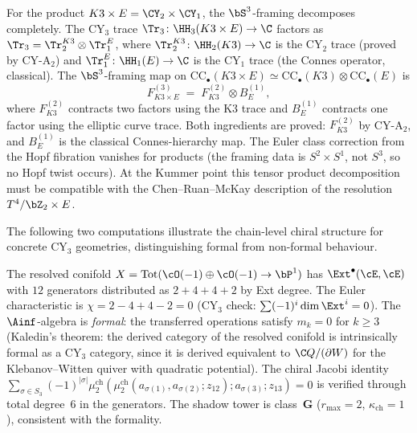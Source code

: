 \begin{remark}
\label{rem:k3e-product-decomposition}
For the product $K3 \times E = \CY_2 \times \CY_1$, the $\bS^3$-framing decomposes completely. The CY$_3$ trace $\Tr_3 \colon \HH_3(K3 \times E) \to \C$ factors as $\Tr_3 = \Tr_2^{K3} \otimes \Tr_1^E$, where $\Tr_2^{K3} \colon \HH_2(K3) \to \C$ is the CY$_2$ trace (proved by CY-A$_2$) and $\Tr_1^E \colon \HH_1(E) \to \C$ is the CY$_1$ trace (the Connes operator, classical). The $\bS^3$-framing map on $\mathrm{CC}_\bullet(K3 \times E) \simeq \mathrm{CC}_\bullet(K3) \otimes \mathrm{CC}_\bullet(E)$ is
\[
 F^{(3)}_{K3 \times E} \;=\; F^{(2)}_{K3} \otimes B^{(1)}_E,
\]
where $F^{(2)}_{K3}$ contracts two factors using the K3 trace and $B^{(1)}_E$ contracts one factor using the elliptic curve trace. Both ingredients are proved: $F^{(2)}_{K3}$ by CY-A$_2$, and $B^{(1)}_E$ is the classical Connes-hierarchy map. The Euler class correction from the Hopf fibration vanishes for products (the framing data is $S^2 \times S^1$, not $S^3$, so no Hopf twist occurs). At the Kummer point this tensor product decomposition must be compatible with the Chen--Ruan--McKay description of the resolution $T^4/\bZ_2 \times E$.
\end{remark}


The following two computations illustrate the chain-level chiral
structure for concrete CY$_3$ geometries, distinguishing formal
from non-formal behaviour.

\begin{computation}
\label{comp:conifold-chain-level}
The resolved conifold
$X = \mathrm{Tot}(\cO(-1) \oplus \cO(-1) \to \bP^1)$
has $\Ext^\bullet(\cE, \cE)$ with $12$ generators distributed
as $2 + 4 + 4 + 2$ by Ext degree. The Euler characteristic is
$\chi = 2 - 4 + 4 - 2 = 0$ (CY$_3$ check: $\sum (-1)^i \dim
\Ext^i = 0$). The $\Ainf$-algebra is \emph{formal}: the
transferred operations satisfy $m_k = 0$ for $k \geq 3$
(Kaledin's theorem: the derived category of the resolved conifold
is intrinsically formal as a CY$_3$ category, since it is derived
equivalent to $\C Q / (\partial W)$ for the Klebanov--Witten
quiver with quadratic potential). The chiral Jacobi identity
$\sum_{\sigma \in S_3} (-1)^{|\sigma|} \mu_2^{\mathrm{ch}}
(\mu_2^{\mathrm{ch}}(a_{\sigma(1)}, a_{\sigma(2)}; z_{12});
a_{\sigma(3)}; z_{13}) = 0$ is verified through total degree~$6$
in the generators. The shadow tower is class~$\mathbf{G}$
($r_{\max} = 2$, $\kappa_{\mathrm{ch}} = 1$), consistent with the formality.
\end{computation}


